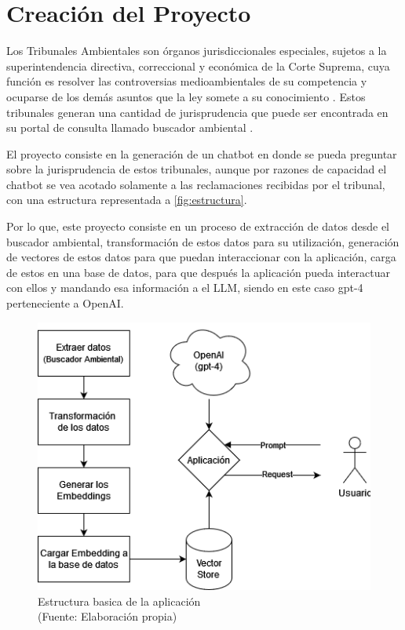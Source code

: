 

\chapter{Creación del Proyecto}


Los Tribunales Ambientales son órganos jurisdiccionales especiales, sujetos a la 
superintendencia directiva, correccional y económica de la Corte Suprema, cuya función 
es resolver las controversias medioambientales de su competencia y ocuparse de los 
demás asuntos que la ley somete a su conocimiento \cite{Ley20600}. Estos tribunales generan una cantidad 
de jurisprudencia que puede ser encontrada en su portal de consulta llamado buscador ambiental \cite{BuscadorAmbiental}. 

El proyecto consiste en la generación de un chatbot en donde se pueda preguntar sobre 
la jurisprudencia de estos tribunales, aunque por razones de capacidad el chatbot se 
vea acotado solamente a las reclamaciones recibidas por el tribunal, con una estructura representada a \autoref{fig:estructura}.

Por lo que, este proyecto consiste en un proceso de extracción de datos 
desde el buscador ambiental, transformación de estos datos para su utilización, generación 
de vectores de estos datos para que puedan interaccionar con la aplicación, carga de estos 
en una base de datos, para que después la aplicación pueda interactuar con ellos y mandando 
esa información a el LLM, siendo en este caso gpt-4 perteneciente a OpenAI.

\begin{figure}[ht!]
    \centering
    \includegraphics[width=.5\textwidth]{figures/huemul1.png}
    \caption[Estructura basica de la aplicación]{Estructura basica de la aplicación\\
    {\scriptsize (Fuente: Elaboración propia)}}
    \label{fig:estructura}
\end{figure}
    

